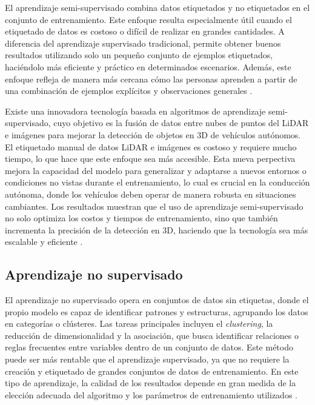 El aprendizaje semi-supervisado combina datos etiquetados y no etiquetados en el conjunto de entrenamiento. Este enfoque resulta especialmente útil cuando el etiquetado de datos es costoso o difícil de realizar en grandes cantidades. A diferencia del aprendizaje supervisado tradicional, permite obtener buenos resultados utilizando solo un pequeño conjunto de ejemplos etiquetados, haciéndolo más eficiente y práctico en determinados escenarios. Además, este enfoque refleja de manera más cercana cómo las personas aprenden a partir de una combinación de ejemplos explícitos y observaciones generales \cite{semi}.

Existe una innovadora tecnología basada en algoritmos de aprendizaje semi-supervisado, cuyo objetivo es la fusión de datos entre nubes de puntos del \ac{LiDAR} e imágenes para mejorar la detección de objetos en 3D de vehículos autónomos. El etiquetado manual de datos \ac{LiDAR} e imágenes es costoso y requiere mucho tiempo, lo que hace que este enfoque sea más accesible. Esta nueva perpectiva mejora la capacidad del modelo para generalizar y adaptarse a nuevos entornos o condiciones no vistas durante el entrenamiento, lo cual es crucial en la conducción autónoma, donde los vehículos deben operar de manera robusta en situaciones cambiantes. Los resultados muestran que el uso de aprendizaje semi-supervisado no solo optimiza los costos y tiempos de entrenamiento, sino que también incrementa la precisión de la detección en 3D, haciendo que la tecnología sea más escalable y eficiente \cite{semi-ex}.

\subsection{Aprendizaje no supervisado}

El aprendizaje no supervisado opera en conjuntos de datos sin etiquetas, donde el propio modelo es capaz de identificar patrones y estructuras, agrupando los datos en categorías o clústeres. Las tareas principales incluyen el \textit{clustering}, la reducción de dimensionalidad y la asociación, que busca identificar relaciones o reglas frecuentes entre variables dentro de un conjunto de datos. Este método puede ser más rentable que el aprendizaje supervisado, ya que no requiere la creación y etiquetado de grandes conjuntos de datos de entrenamiento. En este tipo de aprendizaje, la calidad de los resultados depende en gran medida de la elección adecuada del algoritmo y los parámetros de entrenamiento utilizados \cite{no-supervised-learning}.

